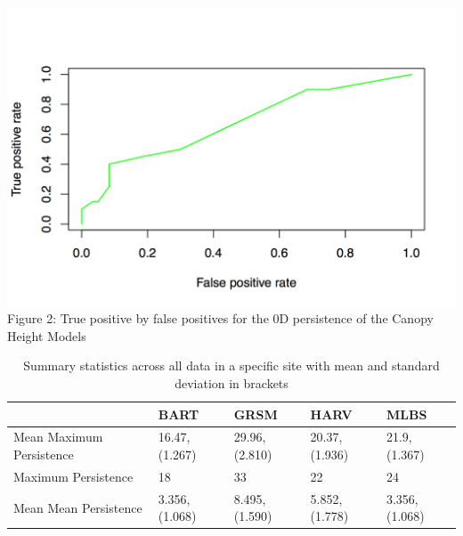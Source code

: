 \documentclass[10pt]{article}
\begin{document}
\includegraphics[scale= 0.5]{0d_roc}\\
Figure 2: True positive by false positives for the 0D persistence of the Canopy Height Models

\begin{table}[]
\centering
\caption{Summary statistics across all data in a specific site with mean and standard deviation in brackets}
\begin{tabular}{|l|l|l|l|l|}
\hline
                         & BART          & GRSM          & HARV          & MLBS          \\ \hline
Mean Maximum Persistence & 16.47,(1.267) & 29.96,(2.810) & 20.37,(1.936) & 21.9,(1.367)  \\ \hline
Maximum Persistence      & 18            & 33            & 22            & 24            \\ \hline
Mean Mean Persistence    & 3.356,(1.068) & 8.495,(1.590) & 5.852,(1.778) & 3.356,(1.068) \\ \hline
\end{tabular}
\end{table}
\end{document}
